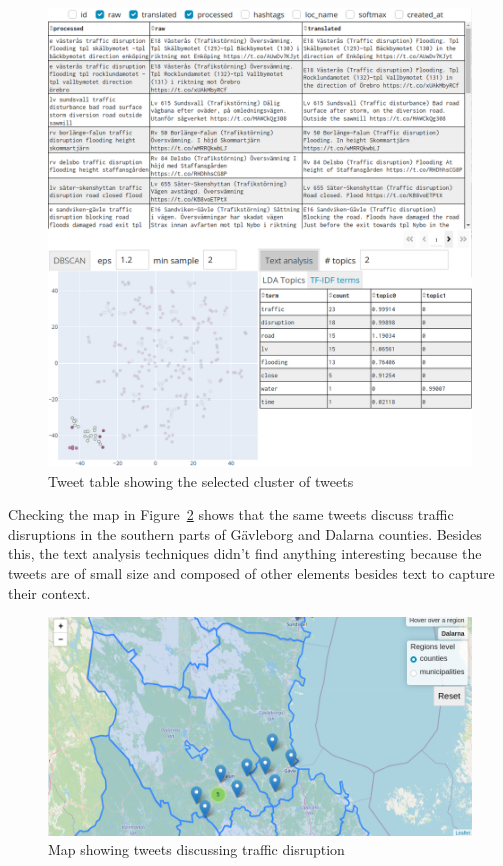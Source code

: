 \begin{figure}[H]
  \begin{center}
    \includegraphics[width=\columnwidth, trim={0cm 13.1cm 0cm 0cm},clip]{./images/gavle_text_analysis.png}
  \end{center}
  \caption{Tweet table showing the selected cluster of tweets}
  \label{fig:gavle_text_analysias_tweets_table}
\end{figure}

Checking the map in Figure~\ref{fig:traffic_disruption_map} shows that the same tweets discuss
traffic disruptions in the southern parts of Gävleborg and Dalarna counties. Besides this, the text
analysis techniques didn't find anything interesting because the tweets are of small size and
composed of other elements besides text to capture their context.

\begin{figure}[H]
  \begin{center}
    \includegraphics[width=14cm]{./images/traffic_disruption_map.png}
  \end{center}
  \caption{Map showing tweets discussing traffic disruption}
  \label{fig:traffic_disruption_map}
\end{figure}

